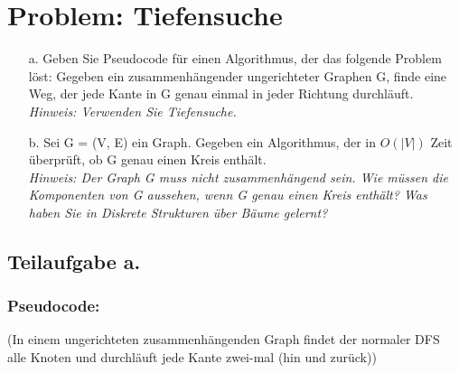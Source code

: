 \section{Problem: Tiefensuche}

\begin{enumerate}
	\item[a.] Geben Sie Pseudocode für einen Algorithmus, der das folgende Problem löst: Gegeben ein zusammenhängender ungerichteter Graphen G, finde eine Weg, der jede Kante in G genau einmal in jeder Richtung durchläuft.\\
	\textit{Hinweis: Verwenden Sie Tiefensuche.}
	
	\item[b.] Sei G = (V, E) ein Graph. Gegeben ein Algorithmus, der in $O(|V |)$ Zeit überprüft, ob G genau einen Kreis enthält.\\
	\textit{Hinweis: Der Graph G muss nicht zusammenhängend sein. Wie müssen die
	Komponenten von G aussehen, wenn G genau einen Kreis enthält? Was haben Sie in Diskrete Strukturen über Bäume gelernt?}
\end{enumerate}

\subsection{Teilaufgabe a.}

\subsubsection{Pseudocode:} (In einem ungerichteten zusammenhängenden Graph findet der normaler DFS alle Knoten und durchläuft jede Kante zwei-mal (hin und zurück))

